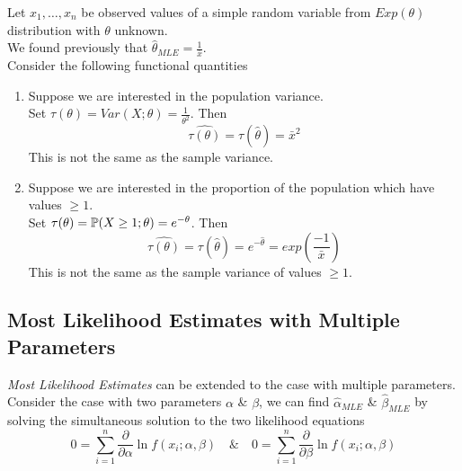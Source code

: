 \documentclass[11pt,a4paper]{article}
\begin{document}
\example{}
Let $x_1,\dots,x_n$ be observed values of a simple random variable from $Exp(\theta)$ distribution with $\theta$ unknown.\\
We found previously that $\hat{\theta}_{MLE}=\frac{1}{\bar{x}}$.\\
Consider the following functional quantities
\begin{enumerate}[label=\roman*)]
\item Suppose we are interested in the population variance.\\
Set $\tau(\theta)=Var(X;\theta)=\frac{1}{\theta^2}$. Then
$$\widehat{\tau(\theta)}=\tau(\hat{\theta})=\bar{x}^2$$
\nb This is not the same as the sample variance.
\item Suppose we are interested in the proportion of the population which have values $\geq1$.\\
Set $\tau(\theta)=\mathbb{P}(X\geq1;\theta)=e^{-\theta}$. Then
$$\widehat{\tau(\theta)}=\tau(\hat{\theta})=e^{-\hat{\theta}}=exp\left(\frac{-1}{\bar{x}}\right)$$
\nb This is not the same as the sample variance of values $\geq1$.
\end{enumerate}

\subsection{Most Likelihood Estimates with Multiple Parameters}

\textit{Most Likelihood Estimates} can be extended to the case with multiple parameters.\\
Consider the case with two parameters $\alpha$ \& $\beta$, we can find $\hat{\alpha}_{MLE}$ \& $\hat{\beta}_{MLE}$ by solving the simultaneous solution to the two likelihood equations
$$0=\sum_{i=1}^n\frac{\partial}{\partial\alpha}\ln f(x_i;\alpha,\beta)\quad\&\quad0=\sum_{i=1}^n\frac{\partial}{\partial\beta}\ln f(x_i;\alpha,\beta)$$
\end{document}
